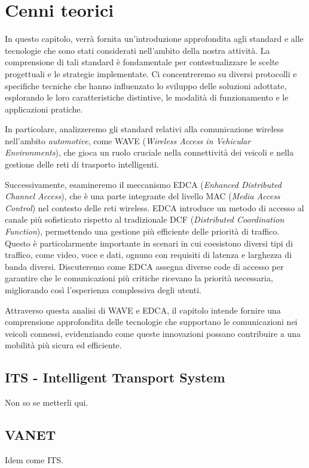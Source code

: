 \chapter{Cenni teorici}

In questo capitolo, verrà fornita un'introduzione approfondita agli standard e alle tecnologie che sono stati considerati nell'ambito della nostra attività. La comprensione di tali standard è fondamentale per contestualizzare le scelte progettuali e le strategie implementate. Ci concentreremo su diversi protocolli e specifiche tecniche che hanno influenzato lo sviluppo delle soluzioni adottate, esplorando le loro caratteristiche distintive, le modalità di funzionamento e le applicazioni pratiche.

In particolare, analizzeremo gli standard relativi alla comunicazione wireless nell'ambito \textit{automotive}, come WAVE (\textit{Wireless Access in Vehicular Environments}), che gioca un ruolo cruciale nella connettività dei veicoli e nella gestione delle reti di trasporto intelligenti. 

Successivamente, esamineremo il meccanismo EDCA (\textit{Enhanced Distributed Channel Access}), che è una parte integrante del livello MAC (\textit{Media Access Control}) nel contesto delle reti wireless. EDCA introduce un metodo di accesso al canale più sofisticato rispetto al tradizionale DCF (\textit{Distributed Coordination Function}), permettendo una gestione più efficiente delle priorità di traffico. Questo è particolarmente importante in scenari in cui coesistono diversi tipi di traffico, come video, voce e dati, ognuno con requisiti di latenza e larghezza di banda diversi. Discuteremo come EDCA assegna diverse code di accesso per garantire che le comunicazioni più critiche ricevano la priorità necessaria, migliorando così l'esperienza complessiva degli utenti.

Attraverso questa analisi di WAVE e EDCA, il capitolo intende fornire una comprensione approfondita delle tecnologie che supportano le comunicazioni nei veicoli connessi, evidenziando come queste innovazioni possano contribuire a una mobilità più sicura ed efficiente.

\section{ITS - Intelligent Transport System}
Non so se metterli qui.

\section{VANET}
Idem come ITS.

